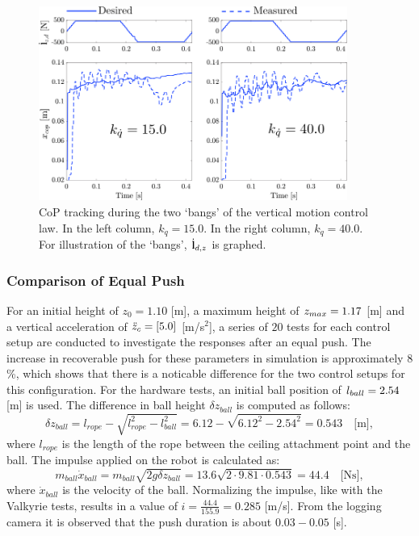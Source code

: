 \begin{figure}
\centering
\includegraphics[width=0.9\textwidth]{STYLESTUFF/atlascop.png}
\caption{\ac{CoP} tracking during the two `bangs' of the vertical motion control law. In the left column, $k_{\dot{q}}=15.0$. In the right column, $k_{\dot{q}}=40.0$. For illustration of the `bangs', $\dot{\mathbf{l}}_{d,z}$ is graphed. }
\label{fig:atlascop}
\end{figure}

\subsubsection{Comparison of Equal Push}
For an initial height of $z_0=1.10$ [m], a maximum height of $z_{max}=1.17$ [m] and a vertical acceleration of $\ddot{z}_{c}=[5.0]$ [m/s$^2$], a series of $20$ tests for each control setup are conducted to investigate the responses after an equal push. The increase in recoverable push for these parameters in simulation is approximately $8$\%, which shows that there is a noticable difference for the two control setups for this configuration. For the hardware tests, an initial ball position of $l_{ball}=2.54$ [m] is used. The difference in ball height $\delta z_{ball}$ is computed as follows:
\begin{equation}
	\delta z_{ball} = l_{rope} - \sqrt{l_{rope}^2-l_{ball}^2} = 6.12-\sqrt{6.12^2 - 2.54^2} = 0.543 \quad \text{[m]},
\end{equation}
where $l_{rope}$ is the length of the rope between the ceiling attachment point and the ball. The impulse applied on the robot is calculated as:
\begin{equation}
m_{ball}\dot{x}_{ball} = m_{ball}\sqrt{2g\delta z_{ball} } = 13.6\sqrt{2 \cdot 9.81 \cdot 0.543} = 44.4 \quad \text{[Ns]},
\end{equation}
where $\dot{x}_{ball}$ is the velocity of the ball. Normalizing the impulse, like with the Valkyrie tests, results in a value of $i=\frac{44.4}{155.9}=0.285$ [m/s]. From the logging camera it is observed that the push duration is about $0.03-0.05$ [s].

